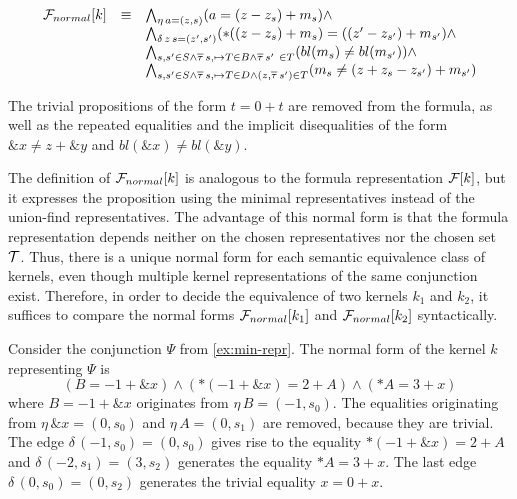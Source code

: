 \[
    \begin{array}{lll}
        \mathcal{F}_{normal}[k] & \equiv & \bigwedge_{\eta\,a=(z,s)} (a = (z - z_s) + m_s) \land                                                                     \\
                       &        & \bigwedge_{\delta\,z\,s=(z',s')} (*((z-z_s) + m_s) = ((z'-z_{s'}) + m_{s'}) \land                                         \\
                       &        & \bigwedge_{s,s' \in S \land \overline{\tau}\,s, \mapsto T \in B \land \overline{\tau}\,s'\ \in T} (bl(m_{s}) \neq bl(m_{s'})) \land           \\
                       &        & \bigwedge_{s,s' \in S \land \overline{\tau}\,s, \mapsto T \in D \land (z,\overline{\tau}\,s') \in T} (m_{s} \neq (z+ z_{s} -z_{s'}) + m_{s'})
    \end{array}
\]

The trivial propositions of the form $t = 0 + t$ are removed from the formula, as well as the repeated equalities and the implicit disequalities of the form $\&x \neq z + \&y$ and $bl(\&x) \neq bl(\&y)$.

The definition of $\mathcal{F}_{normal}[k]$ is analogous to the formula representation $\mathcal{F}[k]$, but it expresses the proposition using the minimal representatives instead of the union-find representatives.
The advantage of this normal form is that the formula representation depends neither on the chosen representatives nor the chosen set $\mathcal{T}$.
Thus, there is a unique normal form for each semantic equivalence class of kernels, even though multiple kernel representations of the same conjunction exist.
Therefore, in order to decide the equivalence of two kernels $k_1$ and $k_2$, it suffices to compare the normal forms $\mathcal{F}_{normal}[k_1]$ and $\mathcal{F}_{normal}[k_2]$ syntactically.

\begin{example}
    Consider the conjunction $\Psi$ from \cref{ex:min-repr}.
    The normal form of the kernel $k$ representing $\Psi$ is
    \[
        (B = -1+\&x) \land (*(-1 + \&x) = 2 + A) \land (*A = 3 + x)
    \]
    where $B = -1 + \&x$ originates from $\eta\,B = (-1,s_0)$.
    The equalities originating from $\eta\,\&x = (0,s_0)$ and $\eta\,A = (0, s_1)$ are removed, because they are trivial.
    The edge $\delta\,(-1,s_0) = (0,s_0)$ gives rise to the equality $*(-1 + \&x) = 2 + A$ and $\delta\,(-2,s_1) = (3,s_2)$ generates the equality $*A = 3 + x$.
    The last edge $\delta\,(0,s_0) = (0,s_2)$ generates the trivial equality $x = 0 + x$.
\end{example}

